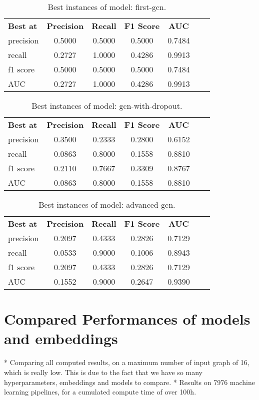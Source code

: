 \begin{table}[H]
    \centering
    \caption{Best instances of model: first-gcn.}
    \begin{tabular}{lcccccc}
      \textbf{Best at}  & \textbf{Precision} & \textbf{Recall} & \textbf{F1 Score} & \textbf{AUC} \\
        precision & 0.5000 & 0.5000 & 0.5000 & 0.7484 \\
        recall & 0.2727 & 1.0000 & 0.4286 & 0.9913 \\
        f1 score & 0.5000 & 0.5000 & 0.5000 & 0.7484 \\
        AUC & 0.2727 & 1.0000 & 0.4286 & 0.9913 \\
    \end{tabular}
\end{table}

\begin{table}[H]
    \centering
    \caption{Best instances of model: gcn-with-dropout.}
    \begin{tabular}{lcccccc}
      \textbf{Best at}  & \textbf{Precision} & \textbf{Recall} & \textbf{F1 Score} & \textbf{AUC} \\
        precision & 0.3500 & 0.2333 & 0.2800 & 0.6152 \\
        recall & 0.0863 & 0.8000 & 0.1558 & 0.8810 \\
        f1 score & 0.2110 & 0.7667 & 0.3309 & 0.8767 \\
        AUC & 0.0863 & 0.8000 & 0.1558 & 0.8810 \\
    \end{tabular}
\end{table}

\begin{table}[H]
    \centering
    \caption{Best instances of model: advanced-gcn.}
    \begin{tabular}{lcccccc}
      \textbf{Best at}  & \textbf{Precision} & \textbf{Recall} & \textbf{F1 Score} & \textbf{AUC} \\
        precision & 0.2097 & 0.4333 & 0.2826 & 0.7129 \\
        recall & 0.0533 & 0.9000 & 0.1006 & 0.8943 \\
        f1 score & 0.2097 & 0.4333 & 0.2826 & 0.7129 \\
        AUC & 0.1552 & 0.9000 & 0.2647 & 0.9390 \\
    \end{tabular}
\end{table}

\section{Compared Performances of models and embeddings}
* Comparing all computed results, on a maximum number of input graph of 16, which is really low. This is due to the fact that we have so many hyperparameters, embeddings and models to compare.
* Results on 7976 machine learning pipelines, for a cumulated compute time of over 100h.

